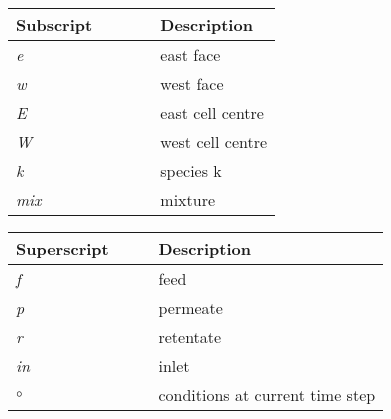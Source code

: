 \begin{table}[H]
	\label{tab:subscripts} 
	\begin{tabular}{|l|l|}
		\hline
		\textbf{Subscript \ \ \ \ \ }	& \textbf{Description}  \\ \hline
		\textit{e} 			& east face 			\\ \hline
		\textit{w} 			& west face     		\\ \hline
		\textit{E} 			& east cell centre 		\\ \hline 
		\textit{W} 			& west cell centre 		\\ \hline 
		\textit{k} 			& species k 			\\ \hline 
		\textit{mix} 		& mixture				\\ \hline 
	\end{tabular}
\end{table}

\begin{table}[H]
	\label{tab:superscripts} 
	\begin{tabular}{|l|l|}
		\hline
		\textbf{Superscript \ \ \ }	& \textbf{Description}		\\ \hline
		\textit{f} 				& feed 								\\ \hline
		\textit{p} 				& permeate 							\\ \hline 
		\textit{r} 				& retentate 						\\ \hline 
		\textit{in} 			& inlet 							\\ \hline 
		$\circ$					& conditions at current time step 	\\ \hline 
	\end{tabular}
\end{table}
